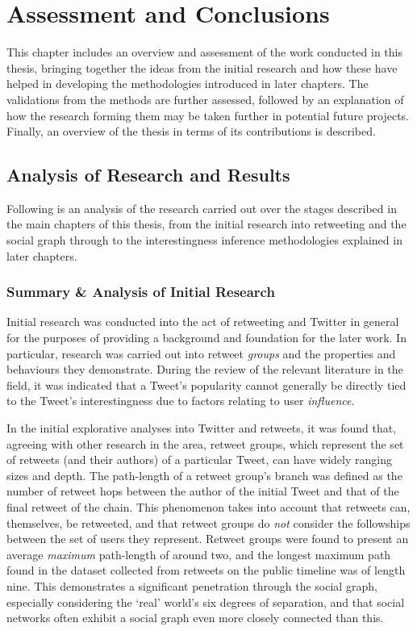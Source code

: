 \chapter{Assessment and Conclusions}
This chapter includes an overview and assessment of the work conducted in this thesis, bringing together the ideas from the initial research and how these have helped in developing the methodologies introduced in later chapters. The validations from the methods are further assessed, followed by an explanation of how the research forming them may be taken further in potential future projects. Finally, an overview of the thesis in terms of its contributions is described.


\section{Analysis of Research and Results}
Following is an analysis of the research carried out over the stages described in the main chapters of this thesis, from the initial research into retweeting and the social graph through to the interestingness inference methodologies explained in later chapters.

\subsection{Summary \& Analysis of Initial Research}
Initial research was conducted into the act of retweeting and Twitter in general for the purposes of providing a background and foundation for the later work. In particular, research was carried out into retweet \textit{groups} and the properties and behaviours they demonstrate. During the review of the relevant literature in the field, it was indicated that a Tweet's popularity cannot generally be directly tied to the Tweet's interestingness due to factors relating to user \textit{influence}.

In the initial explorative analyses into Twitter and retweets, it was found that, agreeing with other research in the area, retweet groups, which represent the set of retweets (and their authors) of a particular Tweet, can have widely ranging sizes and depth. The path-length of a retweet group's branch was defined as the number of retweet hops between the author of the initial Tweet and that of the final retweet of the chain. This phenomenon takes into account that retweets can, themselves, be retweeted, and that retweet groups do \textit{not} consider the followships between the set of users they represent. Retweet groups were found to present an average \textit{maximum} path-length of around two, and the longest maximum path found in the dataset collected from retweets on the public timeline was of length nine. This demonstrates a significant penetration through the social graph, especially considering the `real' world's six degrees of separation, and that social networks often exhibit a social graph even more closely connected than this.

